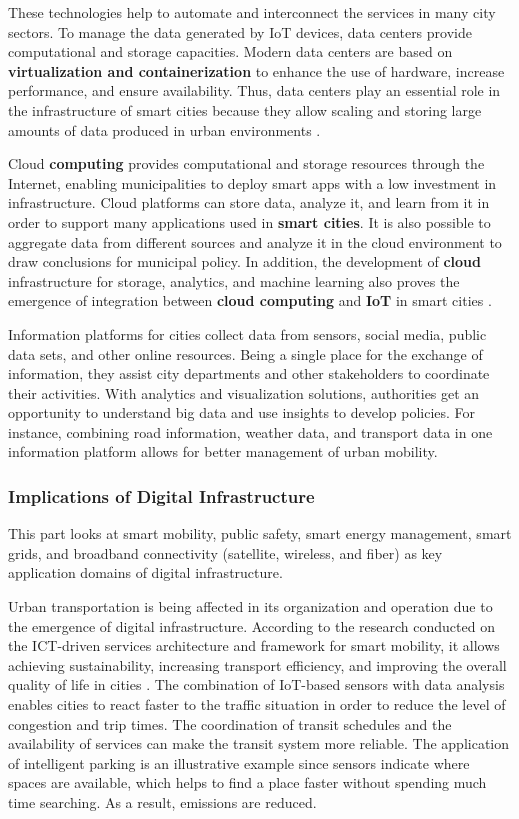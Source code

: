 \documentclass[pdflatex,sn-mathphys-num]{sn-jnl}%
\theoremstyle{thmstyleone}%
\theoremstyle{thmstyletwo}%
\theoremstyle{thmstylethree}%
\begin{document}
These technologies help to automate and interconnect the services in many city sectors. To manage the data generated by IoT devices, data centers provide computational and storage capacities. Modern data centers are based on \textbf{virtualization and containerization} to enhance the use of hardware, increase performance, and ensure availability. Thus, data centers play an essential role in the infrastructure of smart cities because they allow scaling and storing large amounts of data produced in urban environments \cite{r16}.

Cloud \textbf{computing} provides computational and storage resources through the Internet, enabling municipalities to deploy smart apps with a low investment in infrastructure. Cloud platforms can store data, analyze it, and learn from it in order to support many applications used in \textbf{smart cities}. It is also possible to aggregate data from different sources and analyze it in the cloud environment to draw conclusions for municipal policy. In addition, the development of \textbf{cloud} infrastructure for storage, analytics, and machine learning also proves the emergence of integration between \textbf{cloud computing} and \textbf{IoT} in smart cities \cite{r10}.

Information platforms for cities collect data from sensors, social media, public data sets, and other online resources. Being a single place for the exchange of information, they assist city departments and other stakeholders to coordinate their activities. With analytics and visualization solutions, authorities get an opportunity to understand big data and use insights to develop policies. For instance, combining road information, weather data, and transport data in one information platform allows for better management of urban mobility.

\subsubsection{Implications of Digital Infrastructure}
\noindent This part looks at smart mobility, public safety, smart energy management, smart grids, and broadband connectivity (satellite, wireless, and fiber) as key application domains of digital infrastructure.

Urban transportation is being affected in its organization and operation due to the emergence of digital infrastructure. According to the research conducted on the ICT-driven services architecture and framework for smart mobility, it allows achieving sustainability, increasing transport efficiency, and improving the overall quality of life in cities \cite{r107,r15}. The combination of IoT-based sensors with data analysis enables cities to react faster to the traffic situation in order to reduce the level of congestion and trip times. The coordination of transit schedules and the availability of services can make the transit system more reliable. The application of intelligent parking is an illustrative example since sensors indicate where spaces are available, which helps to find a place faster without spending much time searching. As a result, emissions are reduced.\cite{r12}
\end{document}
